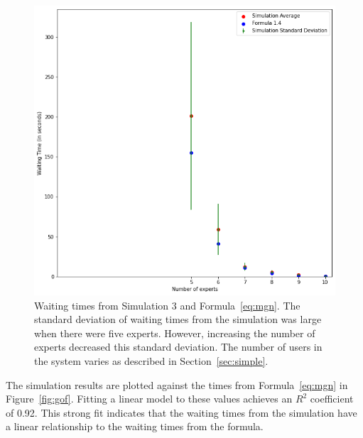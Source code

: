 \begin{figure}[H]
  \includegraphics[width=\textwidth]{figures/montecarlo/full_expected_sim.png}
  \caption{
    Waiting times from Simulation 3 and Formula~\ref{eq:mgn}.
    The standard deviation of waiting times from the simulation was large when
    there were five experts.
    However, increasing the number of experts decreased this standard deviation.
    The number of users in the system varies as described in
    Section~\ref{sec:simple}.
  }\label{fig:full_expected_sim}
\end{figure}

The simulation results are plotted against the times from Formula~\ref{eq:mgn}
in Figure~\ref{fig:gof}.
Fitting a linear model to these values achieves an $R^2$ coefficient of 0.92.
This strong fit indicates that the waiting times from the simulation have a
linear relationship to the waiting times from the formula.

